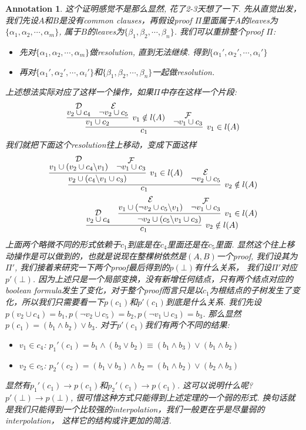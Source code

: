 \documentclass{article}
\newtheorem{annotation}[theorem]{Annotation}
\begin{document}
\begin{annotation}
\rm 这个证明感觉不是那么显然, 花了2-3天想了一下. 先从直觉出发，我们先设$A$和$B$是没有common clauses，再假设proof $\varPi$里面属于$A$的leaves为$\{\alpha_1, \alpha_2, \cdots, \alpha_m\}$, 属于$B$的leaves为$\{\beta_1, \beta_2, \cdots, \beta_n\}$. 我们可以重排整个proof $\varPi$: 
\begin{itemize}
	\item 先对$\{\alpha_1, \alpha_2, \cdots, \alpha_m\}$做resolution, 直到无法继续. 得到$\{\alpha_1', \alpha_2', \cdots, \alpha_i'\}$
	\item 再对$\{\alpha_1', \alpha_2', \cdots, \alpha_i'\}$和$\{\beta_1, \beta_2, \cdots, \beta_n\}$一起做resolution.
\end{itemize}
上述想法实际对应了这样一个操作，如果$\varPi$中存在这样一个片段:
\[
	\infer[v_1 \in l(A)]{c_1}{\infer[v_1 \notin l(A)]{v_1 \cup c_2}{\deduce{v_2 \cup c_4}{\mathcal{D}} & \deduce{\neg v_2 \cup c_5}{\mathcal{E}}} & \deduce{\neg v_1 \cup c_3}{\mathcal{F}}}
\]
我们就把下面这个resolution往上移动，变成下面这样
\[
	\begin{aligned}
	\infer[v_2 \notin l(A)]{c_1}{\infer[v_1 \in l(A)]{v_2 \cup (c_4 \backslash v_1 \cup c_3)}{\deduce{v_1 \cup (v_2 \cup c_4 \backslash v_1)}{\mathcal{D}} & \deduce{\neg v_1 \cup c_3}{\mathcal{F}}} & \deduce{\neg v_2 \cup c_5}{\mathcal{E}}}\\ 
	\infer[v_2 \notin l(A)]{c_1}{\deduce{v_2 \cup c_4 }{\mathcal{D}} & \infer[v_1 \in l(A)]{\neg v_2 \cup (c_5 \backslash v_1 \cup c_3)}{\deduce{v_1 \cup (\neg v_2 \cup c_5 \backslash v_1)}{\mathcal{E}} & \deduce{\neg v_1 \cup c_3}{\mathcal{F}}}}
	\end{aligned}
\]
上面两个略微不同的形式依赖于$c_1$到底是在$c_4$里面还是在$c_5$里面. 显然这个往上移动操作是可以做到的，也就是说现在整棵树依然是$(A,B)$一个proof, 我们设其为$\varPi'$, 我们接着来研究一下两个proof最后得到的$p(\bot)$有什么关系， 我们设$\varPi'$对应$p'(\bot)$. 因为上述只是一个局部变换，没有新增任何结点，只有两个结点对应的boolean formula发生了变化，对于整个proof而言只是以$c_1$为根结点的子树发生了变化，所以我们只需要看一下$p(c_1)$和$p'(c_1)$到底是什么关系. 我们先设$p(v_2 \cup c_4) = b_1, p(\neg v_2 \cup c_5) = b_2, p(\neg v_1 \cup c_3) = b_3$. 那么显然$p(c_1) = (b_1 \wedge b_2) \vee b_3$. 对于$p'(c_1)$我们有两个不同的结果:
\begin{itemize}
	\item $v_1 \in c_4$: $p_1'(c_1) = b_1 \wedge (b_3 \vee b_2) \equiv (b_1 \wedge b_3) \vee (b_1 \wedge b_2)$
	\item $v_2 \in c_5$: $p_2'(c_2) = (b_1 \vee b_3) \wedge b_2 = (b_1 \wedge b_2) \vee (b_2 \wedge b_3)$
\end{itemize}
显然有$p_1'(c_1) \to p(c_1)$和$p_2'(c_1) \to p(c_1)$. 这可以说明什么呢? $p'(\bot) \to p(\bot)$, 很可惜这种方式只能得到上述定理的一个弱的形式. 换句话就是我们只能得到一个比较强的interpolation，我们一般更在乎是尽量弱的interpolation， 这样它的结构或许更加的简洁.



\end{annotation}
\end{document}
